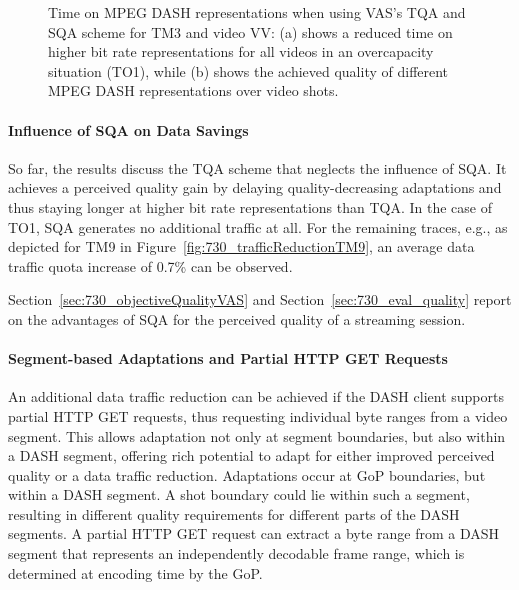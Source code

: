 \begin{figure}[!ht]
 \caption[Time on MPEG DASH representation when using VAS]{Time on MPEG DASH representations when using VAS's TQA and SQA scheme for TM3 and video VV: (a) shows a reduced time on higher bit rate representations for all videos in an overcapacity situation (TO1), while (b) shows the achieved quality of different MPEG DASH representations over video shots.}
  \label{fig:730_timeOnReps}
\end{figure}
\paragraph{Influence of SQA on Data Savings}
So far, the results discuss the \ac{TQA} scheme that neglects the influence of \ac{SQA}.
It achieves a perceived quality gain by delaying quality-decreasing adaptations and thus staying longer at higher bit rate representations than \ac{TQA}.
In the case of TO1, \ac{SQA} generates no additional traffic at all.
For the remaining traces, e.g., as depicted for TM9 in Figure~\ref{fig:730_trafficReductionTM9}, an average data traffic quota increase of 0.7\% can be observed.

Section~\ref{sec:730_objectiveQualityVAS} and Section~\ref{sec:730_eval_quality} report on the advantages of \ac{SQA} for the perceived quality of a streaming session.
\paragraph{Segment-based Adaptations and Partial HTTP GET Requests}
An additional data traffic reduction can be achieved if the \ac{DASH} client supports partial HTTP GET requests, thus requesting individual byte ranges from a video segment.
This allows adaptation not only at segment boundaries, but also within a \ac{DASH} segment, offering rich potential to adapt for either improved perceived quality or a data traffic reduction. 
Adaptations occur at \ac{GoP} boundaries, but within a \ac{DASH} segment.
A shot boundary could lie within such a segment, resulting in different quality requirements for different parts of the \ac{DASH} segments. 
A partial \ac{HTTP} GET request can extract a byte range from a \ac{DASH} segment that represents an independently decodable frame range, which is determined at encoding time by the \ac{GoP}. 

